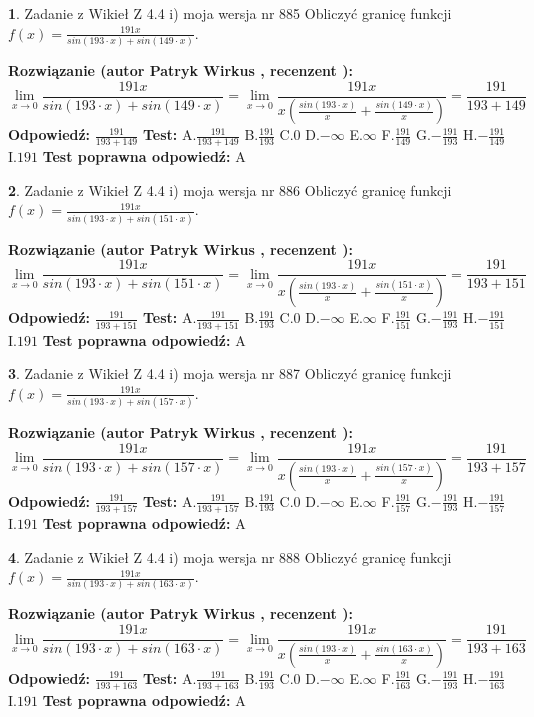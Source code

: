 \documentclass[12pt, a4paper]{article}
\theoremstyle{definition} %
\newtheorem{zad}{}
\newcommand{\zadStart}[1]{\begin{zad}#1\newline}
\newcommand{\zadStop}{\end{zad}}
\newcommand{\rozwStart}[2]{\noindent \textbf{Rozwiązanie (autor #1 , recenzent #2): }\newline}
\newcommand{\rozwStop}{\newline}
\newcommand{\odpStart}{\noindent \textbf{Odpowiedź:}\newline}
\newcommand{\odpStop}{\newline}
\newcommand{\testStart}{\noindent \textbf{Test:}\newline}
\newcommand{\testStop}{\newline}
\newcommand{\kluczStart}{\noindent \textbf{Test poprawna odpowiedź:}\newline}
\newcommand{\kluczStop}{\newline}
\begin{document}
\zadStart{Zadanie z Wikieł Z 4.4 i) moja wersja nr 885}
Obliczyć granicę funkcji $f(x)=\frac{191x}{sin(193\cdot x) +sin(149\cdot x)}$.
\zadStop
\rozwStart{Patryk Wirkus}{}
$$\lim\limits_{x\to 0}\frac{191x}{sin(193\cdot x) +sin(149\cdot x)}=\lim\limits_{x\to 0}\frac{191x}{x(\frac{sin(193\cdot x)}{x}+\frac{sin(149\cdot x)}{x})}=\frac{191}{193+149}$$
\rozwStop
\odpStart
$\frac{191}{193+149}$
\odpStop
\testStart
A.$\frac{191}{193+149}$
B.$\frac{191}{193}$
C.$0$
D.$-\infty$
E.$\infty$
F.$\frac{191}{149}$
G.$-\frac{191}{193}$
H.$-\frac{191}{149}$
I.$191$
\testStop
\kluczStart
A
\kluczStop



\zadStart{Zadanie z Wikieł Z 4.4 i) moja wersja nr 886}
Obliczyć granicę funkcji $f(x)=\frac{191x}{sin(193\cdot x) +sin(151\cdot x)}$.
\zadStop
\rozwStart{Patryk Wirkus}{}
$$\lim\limits_{x\to 0}\frac{191x}{sin(193\cdot x) +sin(151\cdot x)}=\lim\limits_{x\to 0}\frac{191x}{x(\frac{sin(193\cdot x)}{x}+\frac{sin(151\cdot x)}{x})}=\frac{191}{193+151}$$
\rozwStop
\odpStart
$\frac{191}{193+151}$
\odpStop
\testStart
A.$\frac{191}{193+151}$
B.$\frac{191}{193}$
C.$0$
D.$-\infty$
E.$\infty$
F.$\frac{191}{151}$
G.$-\frac{191}{193}$
H.$-\frac{191}{151}$
I.$191$
\testStop
\kluczStart
A
\kluczStop



\zadStart{Zadanie z Wikieł Z 4.4 i) moja wersja nr 887}
Obliczyć granicę funkcji $f(x)=\frac{191x}{sin(193\cdot x) +sin(157\cdot x)}$.
\zadStop
\rozwStart{Patryk Wirkus}{}
$$\lim\limits_{x\to 0}\frac{191x}{sin(193\cdot x) +sin(157\cdot x)}=\lim\limits_{x\to 0}\frac{191x}{x(\frac{sin(193\cdot x)}{x}+\frac{sin(157\cdot x)}{x})}=\frac{191}{193+157}$$
\rozwStop
\odpStart
$\frac{191}{193+157}$
\odpStop
\testStart
A.$\frac{191}{193+157}$
B.$\frac{191}{193}$
C.$0$
D.$-\infty$
E.$\infty$
F.$\frac{191}{157}$
G.$-\frac{191}{193}$
H.$-\frac{191}{157}$
I.$191$
\testStop
\kluczStart
A
\kluczStop



\zadStart{Zadanie z Wikieł Z 4.4 i) moja wersja nr 888}
Obliczyć granicę funkcji $f(x)=\frac{191x}{sin(193\cdot x) +sin(163\cdot x)}$.
\zadStop
\rozwStart{Patryk Wirkus}{}
$$\lim\limits_{x\to 0}\frac{191x}{sin(193\cdot x) +sin(163\cdot x)}=\lim\limits_{x\to 0}\frac{191x}{x(\frac{sin(193\cdot x)}{x}+\frac{sin(163\cdot x)}{x})}=\frac{191}{193+163}$$
\rozwStop
\odpStart
$\frac{191}{193+163}$
\odpStop
\testStart
A.$\frac{191}{193+163}$
B.$\frac{191}{193}$
C.$0$
D.$-\infty$
E.$\infty$
F.$\frac{191}{163}$
G.$-\frac{191}{193}$
H.$-\frac{191}{163}$
I.$191$
\testStop
\kluczStart
A
\kluczStop
\end{document}
